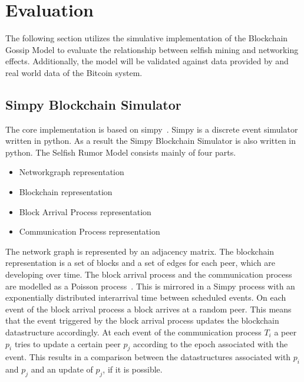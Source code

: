 \chapter{Evaluation}\label{chap:evaluation}
The following section utilizes the simulative implementation of the Blockchain Gossip Model to evaluate the relationship between selfish mining and networking effects. Additionally, the model will be validated against data provided by \gopalan and real world data of the Bitcoin system.
\section{Simpy Blockchain Simulator}
The core implementation is based on simpy~\cite{simpy}. Simpy is a discrete event simulator written in python. As a result the Simpy Blockchain Simulator is also written in python. 
The Selfish Rumor Model consists mainly of four parts. 
\begin{itemize}
\item Networkgraph representation
\item Blockchain representation
\item Block Arrival Process representation
\item Communication Process representation
\end{itemize}
The network graph is represented by an adjacency matrix. The blockchain representation is a set of blocks and a set of edges for each peer, which are developing over time. The block arrival process and the communication process are modelled as a Poisson process~\cite{poisson}. This is mirrored in a Simpy process with an exponentially distributed interarrival time between scheduled events.
On each event of the block arrival process a block arrives at a random peer. This means that the event triggered by the block arrival process updates the blockchain datastructure accordingly.
At each event of the communication process $T_i$ a peer $p_i$ tries to update a certain peer $p_j$ according to the epoch associated with the event. This results in a comparison between the datastructures associated with $p_i$ and $p_j$ and an update of $p_j$, if it is possible.

